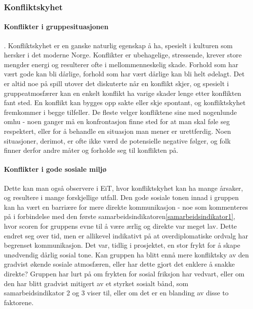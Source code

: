 \subsubsection{Konfliktskyhet}

\paragraph{Konflikter i gruppesituasjonen}. Konfliktskyhet er en ganske naturlig egenskap å ha, spesielt i kulturen som hersker i det moderne Norge. Konflikter er ubehagelige, stressende, krever store mengder energi og resulterer ofte i mellommenneskelig skade. Forhold som har vært gode kan bli dårlige, forhold som har vært dårlige kan bli helt ødelagt. Det er altid noe på spill utover det diskuterte når en konflikt skjer, og spesielt i gruppeatmosfærer kan en enkelt konflikt ha varige skader lenge etter konflikten fant sted. En konflikt kan bygges opp sakte eller skje spontant, og konfliktskyhet fremkommer i begge tilfeller. De fleste velger konfliktene sine med nogenlunde omhu - noen ganger må en konfrontasjon finne sted for at man skal føle seg respektert, eller for å behandle en situasjon man mener er urettferdig. Noen situasjoner, derimot, er ofte ikke værd de potensielle negative følger, og folk finner derfor andre måter og forholde seg til konflikten på. 

\paragraph{Konflikter i gode sosiale miljø}
Dette kan man også observere i EiT, hvor konfliktskyhet kan ha mange årsaker, og resultere i mange forskjellige utfall. Den gode sosiale tonen innad i gruppen kan ha vært en barriære for mere direkte kommunikasjon - noe som kommenteres på i forbindelse med den første samarbeidsindikatoren\ref{samarbeidsindikator1}, hvor scoren for gruppens evne til å være ærlig og direkte var meget lav. Dette endret seg over tid, men er allikevel indikativt på at overdiplomatiske ordvalg har begrenset kommunikasjon. Det var, tidlig i prosjektet, en stor frykt for å skape unødvendig dårlig sosial tone. Kan gruppen ha blitt ennå mere konfliktsky av den gradvist økende sosiale atmosfæren, eller har dette gjort det enklere å snakke direkte? Gruppen har lurt på om frykten for sosial friksjon har vedvart, eller om den har blitt gradvist mitigert av et styrket sosialt bånd, som samarbeidsindikator 2 og 3 viser til, eller om det er en blanding av disse to faktorene. 


